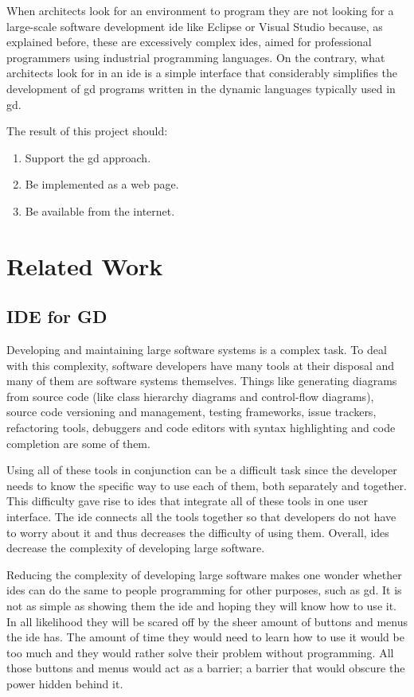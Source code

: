 \documentclass{./llncs2e/llncs}
\begin{document}
	When architects look for an environment to program they are not looking for a large-scale software development \ac{ide} like Eclipse or Visual Studio because, as explained before, these are excessively complex \acp{ide}, aimed for professional programmers using industrial programming languages.
	On the contrary, what architects look for in an \ac{ide} is a simple interface that considerably simplifies the development of \ac{gd} programs written in the dynamic languages typically used in \ac{gd}. 

	The result of this project should:
	\begin{enumerate}
		\item Support the \acl{gd} approach.
		\item Be implemented as a web page.
		\item Be available from the internet.
	\end{enumerate}
	

\section{Related Work}

\subsection{IDE for GD}
	Developing and maintaining large software systems is a complex task.
	To deal with this complexity, software developers have many tools at their disposal and many of them are software systems themselves.
	Things like generating diagrams from source code (like class hierarchy diagrams and control-flow diagrams), source code versioning and management, testing frameworks, issue trackers, refactoring tools, debuggers and code editors with syntax highlighting and code completion are some of them.  

	Using all of these tools in conjunction can be a difficult task since the developer needs to know the specific way to use each of them, both separately and together.
	This difficulty gave rise to \ac{ide}s that integrate all of these tools in one user interface.
	The \ac{ide} connects all the tools together so that developers do not have to worry about it and thus decreases the difficulty of using them.
	Overall, \ac{ide}s decrease the complexity of developing large software.

	Reducing the complexity of developing large software makes one wonder whether \acp{ide} can do the same to people programming for other purposes, such as \ac{gd}.
	It is not as simple as showing them the \ac{ide} and hoping they will know how to use it.
	In all likelihood they will be scared off by the sheer amount of buttons and menus the \ac{ide} has.
	The amount of time they would need to learn how to use it would be too much and they would rather solve their problem without programming.
	All those buttons and menus would act as a barrier; a barrier that would obscure the power hidden behind it.
	
\end{document}
